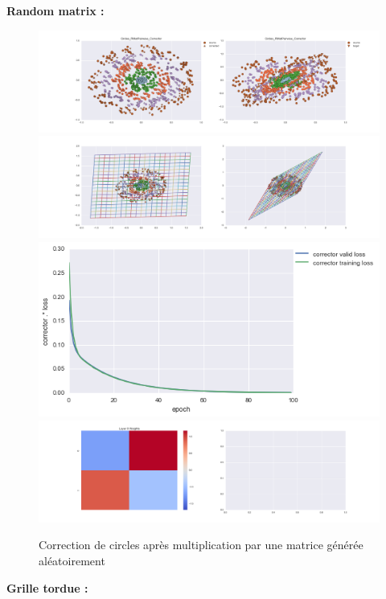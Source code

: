 {\Large \textbf{Random matrix :}}

\begin{figure}[H] %
\centering
\includegraphics[width=\linewidth]{fig/24-05-2016/circles/Circles_RMatPairwise_Corrector-DATA.png}
\includegraphics[width=\linewidth]{fig/24-05-2016/circles/Circles_RMatPairwise_Corrector-GridCheck.png}
\includegraphics[width=0.45\linewidth]{fig/24-05-2016/circles/Circles_RMatPairwise_Corrector-Learning_curve.png}
\includegraphics[width=\linewidth]{fig/24-05-2016/circles/Circles_RMatPairwise_Corrector-W.png}
\caption{Correction de circles après multiplication par une matrice générée aléatoirement}
\label{fig:recap-circles-RMat-pairwise}
\end{figure}


{\Large \textbf{Grille tordue :}}

